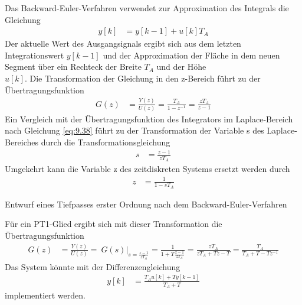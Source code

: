 Das Backward-Euler-Verfahren verwendet zur Approximation des Integrals die Gleichung
\begin{align}
y[ k] &= y[ k - 1] + u[ k]  T_{A} \label{eq:9.39}
\end{align}
Der aktuelle Wert des Ausgangsignals ergibt sich aus dem letzten Integrationswert \(y[k - 1]\) und der Approximation der Fläche in dem neuen Segment über ein Rechteck der Breite \(T_{A}\) und der Höhe\\
\(u[k]\). Die Transformation der Gleichung in den z-Bereich führt zu der Übertragungsfunktion
\begin{align}
G(z) &= \frac{Y(z)}{U(z)} = \frac{T_{A}}{1 - z^{- 1}} = \frac{z  T_{A}}{z - 1} \label{eq:9.40}
\end{align}
Ein Vergleich mit der Übertragungsfunktion des Integrators im Laplace-Bereich nach Gleichung \eqref{eq:9.38} führt zu der Transformation der Variable s des Laplace-Bereiches durch die Transformationsgleichung
\begin{align}
s &= \frac{z - 1}{z  T_{A}} \label{eq:9.41}
\end{align}
Umgekehrt kann die Variable z des zeitdiskreten Systems ersetzt werden durch
\begin{align}
z &= \frac{1}{1 - s  T_{A}} \label{eq:9.42}
\end{align}
\begin{example}{Entwurf eines Tiefpasses erster Ordnung nach dem Backward-Euler-Verfahren}
\label{example:beispiel-entwurf-eines-tiefpasses-erster-ordnung-nach-dem-backward-euler-verfahren}

Für ein PT1-Glied ergibt sich mit dieser Transformation die Übertragungsfunktion
\begin{align*}
G(z) &= \frac{Y(z)}{U(z)} = \left. \ G(s) \right|_{s = \frac{z - 1}{z  T_{A}}} = \frac{1}{1 + T  \frac{z - 1}{z  T_{A}}} = \frac{z  T_{A}}{z  T_{A} + T  z - T} = \frac{T_{A}}{T_{A} + T - T  z^{- 1}} 
\end{align*}
Das System könnte mit der Differenzengleichung
\begin{align*}
y[ k] &= \frac{T_{A}  u[ k] + T  y[ k - 1]}{T_{A} + T} 
\end{align*}
implementiert werden.

\end{example}

